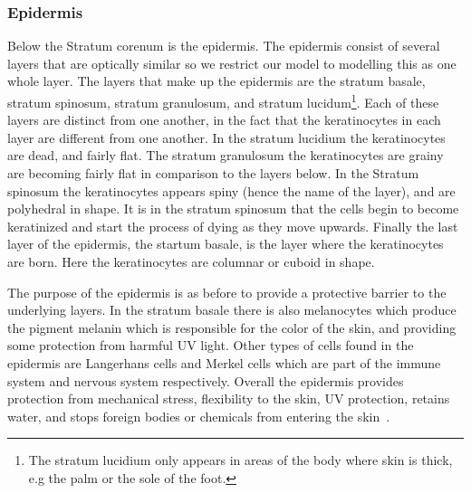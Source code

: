 \subsubsection*{Epidermis} %
\label{ssub:epidermis}

Below the Stratum corenum is the epidermis.
The epidermis consist of several layers that are optically similar so we restrict our model to modelling this as one whole layer.
The layers that make up the epidermis are the stratum basale, stratum spinosum, stratum granulosum, and stratum lucidum\footnote{The stratum lucidium only appears in areas of the body where skin is thick, e.g the palm or the sole of the foot.}.
Each of these layers are distinct from one another, in the fact that the keratinocytes in each layer are different from one another.
In the stratum lucidium the keratinocytes are dead, and fairly flat.
The stratum granulosum the keratinocytes are grainy are becoming fairly flat in comparison to the layers below.
In the Stratum spinosum the keratinocytes appears spiny (hence the name of the layer), and are polyhedral in shape.
It is in the stratum spinosum that the cells begin to become keratinized and start the process of dying as they move upwards.
Finally the last layer of the epidermis, the startum basale, is the layer where the keratinocytes are born.
Here the keratinocytes are columnar or cuboid in shape.

The purpose of the epidermis is as before to provide a protective barrier to the underlying layers. 
In the stratum basale there is also melanocytes which produce the pigment melanin which is responsible for the color of the skin, and providing some protection from harmful UV light. 
Other types of cells found in the epidermis are Langerhans cells and Merkel cells which are part of the immune system and nervous system respectively.
Overall the epidermis provides protection from mechanical stress, flexibility to the skin, UV protection, retains water, and stops foreign bodies or chemicals from entering the skin~\cite{freedberg1999fitzpatrick,zaidi2010dermatology}.


